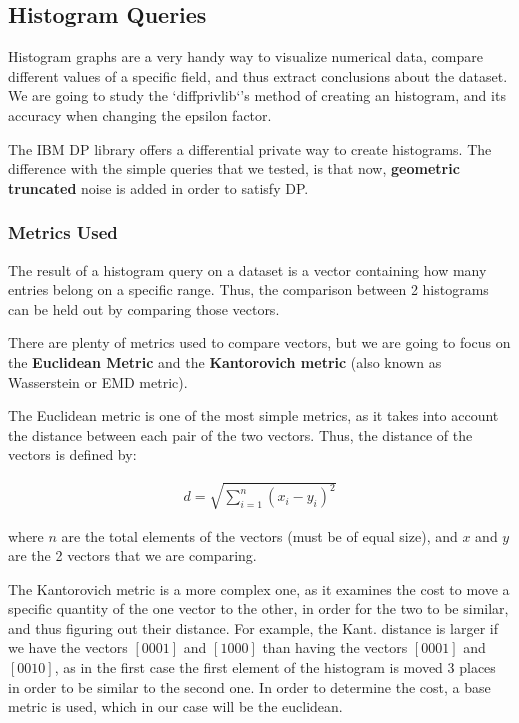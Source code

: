 \subsection{Histogram Queries}

Histogram graphs are a very handy way to visualize numerical data, compare different values of a specific field, and thus extract conclusions about the dataset. We are going to study the `diffprivlib`'s method of creating an histogram, and its accuracy when changing the epsilon factor.

The IBM DP library offers a differential private way to create histograms. The difference with the simple queries that we tested, is that now, \textbf{geometric truncated} noise is added in order to satisfy DP.

\subsubsection{Metrics Used}
The result of a histogram query on a dataset is a vector containing how many entries belong on a specific range. Thus, the comparison between 2 histograms can be held out by comparing those vectors. 

There are plenty of metrics used to compare vectors, but we are going to focus on the \textbf{Euclidean Metric} and the \textbf{Kantorovich metric} (also known as Wasserstein or EMD metric). 

The Euclidean metric is one of the most simple metrics, as it takes into account the distance between each pair of the two vectors. Thus, the distance of the vectors is defined by:

\begin{align*}
    d = \sqrt{\sum_{i=1}^n (x_i - y_i) ^ 2}
\end{align*}

where $n$ are the total elements of the vectors (must be of equal size), and $x$ and $y$ are the 2 vectors that we are comparing.

The Kantorovich metric is a more complex one, as it examines the cost to move a specific quantity of the one vector to the other, in order for the two to be similar, and thus figuring out their distance. For example, the Kant. distance is larger if we have the vectors $[0 0 0 1]$ and $[1 0 0 0]$ than having the vectors $[0 0 0 1]$ and $[0 0 1 0]$, as in the first case the first element of the histogram is moved 3 places in order to be similar to the second one. In order to determine the cost, a base metric is used, which in our case will be the euclidean.

